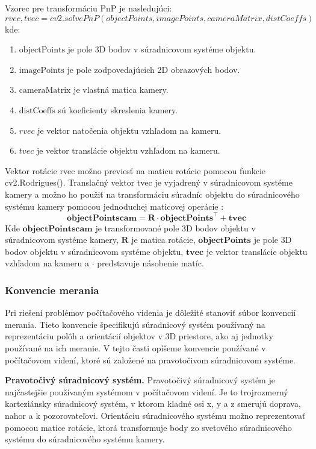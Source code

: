 {Vzorec pre transformáciu PnP je nasledujúci:
\begin{equation}
    rvec, tvec = cv2.solvePnP(objectPoints, imagePoints, cameraMatrix, distCoeffs)
\end{equation}
kde:
\begin{enumerate}
\item $\text{objectPoints}$ je pole 3D bodov v súradnicovom systéme objektu.
\item $\text{imagePoints}$ je pole zodpovedajúcich 2D obrazových bodov.
\item $\text{cameraMatrix}$ je vlastná matica kamery.
\item $\text{distCoeffs}$ sú koeficienty skreslenia kamery.
\item $rvec$ je vektor natočenia objektu vzhľadom na kameru.
\item $tvec$ je vektor translácie objektu vzhľadom na kameru.
\end{enumerate}

Vektor rotácie rvec možno previesť na maticu rotácie pomocou funkcie cv2.Rodrigues(). Translačný vektor tvec je vyjadrený v súradnicovom systéme kamery a možno ho použiť na transformáciu súradníc objektu do súradnicového systému kamery pomocou jednoduchej maticovej operácie \citep{opencv_calib3d}:
\begin{equation}
    \textbf{objectPoints}{\textbf{cam}} = \textbf{R} \cdot \textbf{objectPoints}^{\top} + \textbf{t}{\textbf{vec}}
    \end{equation}
Kde $\textbf{objectPoints}{\textbf{cam}}$ je transformované pole 3D bodov objektu v súradnicovom systéme kamery, $\textbf{R}$ je matica rotácie, $\textbf{objectPoints}$ je pole 3D bodov objektu v súradnicovom systéme objektu, $\textbf{t}{\textbf{vec}}$ je vektor translácie objektu vzhľadom na kameru a $\cdot$ predstavuje násobenie matíc.

\subsubsection{Konvencie merania}
Pri riešení problémov počítačového videnia je dôležité stanoviť súbor konvencií merania. Tieto konvencie špecifikujú súradnicový systém používaný na reprezentáciu polôh a orientácií objektov v 3D priestore, ako aj jednotky používané na ich meranie. V tejto časti opíšeme konvencie používané v počítačovom videní, ktoré sú založené na pravotočivom súradnicovom systéme.

\textbf{Pravotočivý súradnicový systém.} Pravotočivý súradnicový systém je najčastejšie používaným systémom v počítačovom videní. Je to trojrozmerný karteziánsky súradnicový systém, v ktorom kladné osi x, y a z smerujú doprava, nahor a k pozorovateľovi. Orientáciu súradnicového systému možno reprezentovať pomocou matice rotácie, ktorá transformuje body zo svetového súradnicového systému do súradnicového systému kamery.

}
